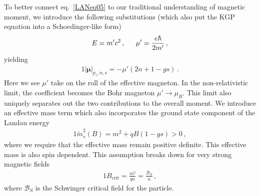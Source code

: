 \documentclass[
aps,
pra,
showpacs,
preprintnumbers,
amsmath,
amssymb,
footinbib
]{revtex4-2}
\begin{document}
To better connect eq.~\eqref{LANeq05} to our traditional understanding of magnetic moment, we introduce the following substitutions (which also put the KGP equation into a Schoedinger-like form) 
\begin{alignat}{1}
  \label{LANeq06} E = m'c^{2}\,,\indent \mu'=\frac{e\hbar}{2m'}\,,
\end{alignat}
yielding
\begin{alignat}{1}
  \label{LANeq07} \left|\boldsymbol{\mu}\right|_{p_{z},n,s}=-\mu'(2n+1-gs)\,.
\end{alignat}
Here we see $\mu'$ take on the roll of the effective magneton. In the non-relativistic limit, the coefficient becomes the Bohr magneton $\mu'\rightarrow\mu_{B}$. This limit also uniquely separates out the two contributions to the overall moment. We introduce an effective mass term which also incorporates the ground state component of the Landau energy
\begin{alignat}{1}
    \label{EffectiveMass} \tilde{m}^{2}_{s}(B)=m^{2}+qB(1-gs)>0\,,
\end{alignat}
where we require that the effective mass remain positive definite. This effective mass is also spin dependent. This assumption breaks down for very strong magnetic fields
\begin{alignat}{1}
    \label{BBreak} B_{\mathrm{crit}}=\frac{m^{2}}{qa}=\frac{\mathcal{B}_{S}}{a}\,,
\end{alignat}
where $\mathcal{B}_{S}$ is the Schwinger critical field for the particle.
\end{document}
